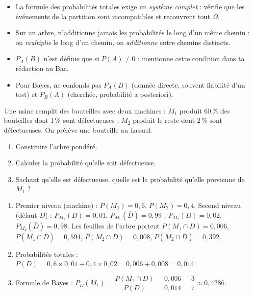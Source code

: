 \documentclass[11pt]{article}
\begin{document}
\begin{attention}
\begin{itemize}
\item La formule des probabilités totales exige un \emph{système complet} : vérifie que les événements de la partition sont incompatibles et recouvrent tout $\Omega$.
\item Sur un arbre, n'additionne jamais les probabilités le long d'un même chemin : on \emph{multiplie} le long d'un chemin, on \emph{additionne} entre chemins distincts.
\item $P_A(B)$ n'est définie que si $P(A)\neq 0$ : mentionne cette condition dans ta rédaction au Bac.
\item Pour Bayes, ne confonds pas $P_A(B)$ (donnée directe, souvent fiabilité d'un test) et $P_B(A)$ (cherchée, probabilité a posteriori).
\end{itemize}
\end{attention}

\begin{exercice}
Une usine remplit des bouteilles avec deux machines : $M_1$ produit $60\,\%$ des bouteilles dont $1\,\%$ sont défectueuses ; $M_2$ produit le reste dont $2\,\%$ sont défectueuses. On prélève une bouteille au hasard. 
\begin{enumerate}
\item Construire l'arbre pondéré.
\item Calculer la probabilité qu'elle soit défectueuse.
\item Sachant qu'elle est défectueuse, quelle est la probabilité qu'elle provienne de $M_1$ ?
\end{enumerate}
\end{exercice}

\begin{corrige}
\begin{enumerate}
\item Premier niveau (machine) : $P(M_1)=0{,}6$, $P(M_2)=0{,}4$. Second niveau (défaut $D$) : $P_{M_1}(D)=0{,}01$, $P_{M_1}(\bar{D})=0{,}99$ ; $P_{M_2}(D)=0{,}02$, $P_{M_2}(\bar{D})=0{,}98$. Les feuilles de l'arbre portent $P(M_1\cap D)=0{,}006$, $P(M_1\cap\bar{D})=0{,}594$, $P(M_2\cap D)=0{,}008$, $P(M_2\cap\bar{D})=0{,}392$.
\item Probabilités totales : $P(D)=0{,}6\times 0{,}01+0{,}4\times 0{,}02=0{,}006+0{,}008=0{,}014$.
\item Formule de Bayes : $P_D(M_1)=\dfrac{P(M_1\cap D)}{P(D)}=\dfrac{0{,}006}{0{,}014}=\dfrac{3}{7}\approx 0{,}4286$.
\end{enumerate}
\end{corrige}
\end{document}
